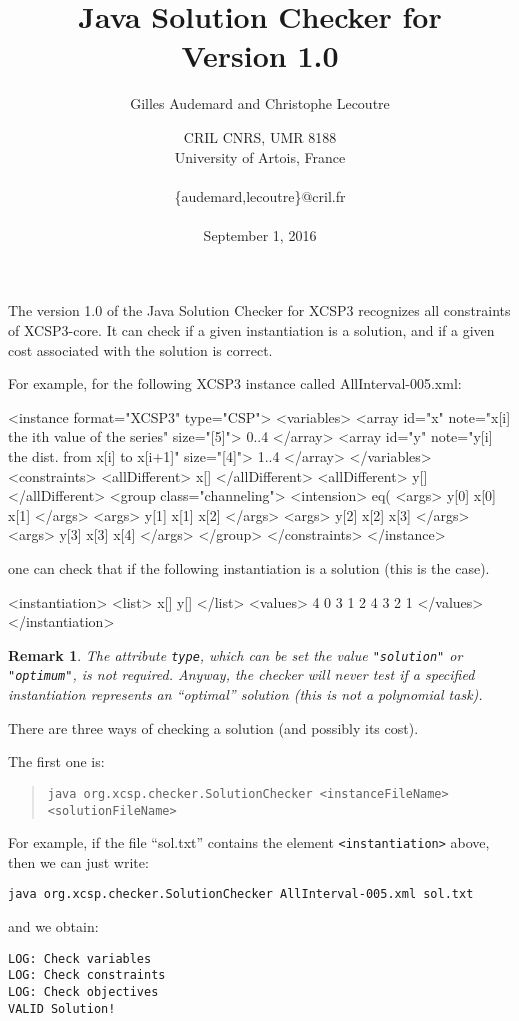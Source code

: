 \documentclass[10pt]{article}
\title{\textcolor{dred}{Java Solution Checker for \xt}\\ \textcolor{dred}{Version 1.0}}
\author{Gilles Audemard and Christophe Lecoutre} %
\date{CRIL CNRS, UMR 8188  \\University of Artois, France \\~ \\\{audemard,lecoutre\}@cril.fr \\~ \\September 1, 2016}
\newenvironment{boxabsc}
               {\medskip \begin{bclogo}[barre=none,arrondi=0.2,logo=]{}\vspace{-0.6cm}}
               {\vspace{-0.1cm}\end{bclogo} \smallskip}
\newtheorem{remark}{Remark}
\def\xt{{\rm XCSP3}\xspace}
\newcommand{\xml}[1]{{\tt <#1>}} %
\newcommand{\att}[1]{{\tt #1}} %
\newcommand{\val}[1]{{\tt "#1"}} %
\begin{document}
\maketitle


The version 1.0 of the Java Solution Checker for \xt recognizes all constraints of \xt-core.
It can check if a given instantiation is a solution, and if a given cost associated with the solution is correct.

For example, for the following \xt instance called AllInterval-005.xml:
\begin{boxabsc}
\begin{absc}
<instance format="XCSP3" type="CSP">
  <variables>
    <array id="x" note="x[i] the ith value of the series" size="[5]"> 0..4 </array>
    <array id="y" note="y[i] the dist. from x[i] to x[i+1]" size="[4]"> 1..4 </array>
  </variables>
  <constraints>
    <allDifferent> x[] </allDifferent>
    <allDifferent> y[] </allDifferent>
    <group class="channeling">
      <intension> eq(%
      <args> y[0] x[0] x[1] </args>
      <args> y[1] x[1] x[2] </args>
      <args> y[2] x[2] x[3] </args>
      <args> y[3] x[3] x[4] </args>
    </group>
  </constraints>
</instance>
\end{absc} 
\end{boxabsc}

one can check that if the following instantiation is a solution (this is the case).
\begin{boxabsc}
\begin{absc}
<instantiation>  
  <list> x[] y[] </list>  
  <values> 4 0 3 1 2 4 3 2 1 </values>  
</instantiation>
\end{absc} 
\end{boxabsc}

\begin{remark}
The attribute \att{type}, which can be set the value \val{solution} or \val{optimum}, is not required. Anyway, the checker will never test if a specified instantiation represents an ``optimal'' solution (this is not a polynomial task).
\end{remark}

There are three ways of checking a solution (and possibly its cost).

The first one is:
\begin{quote}
\verb!java org.xcsp.checker.SolutionChecker <instanceFileName> <solutionFileName>!
\end{quote}

For example, if the file ``sol.txt'' contains the element \xml{instantiation} above,
then we can just write:
\begin{verbatim}
java org.xcsp.checker.SolutionChecker AllInterval-005.xml sol.txt
\end{verbatim}
and we obtain:
\begin{verbatim}
LOG: Check variables
LOG: Check constraints
LOG: Check objectives
VALID Solution!
\end{verbatim}
\end{document}
